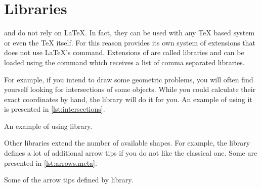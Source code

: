 \section{Libraries}

 and \TikZ{} do not rely on \LaTeX{}. In fact, they can be used with
any \TeX{} based system or even the \TeX{} itself. For this reason \TikZ{}
provides its own system of extensions that does not use \LaTeX{}'s
 command. Extensions of \TikZ{} are called libraries and can be
loaded using the  command which receives a list of comma
separated libraries.

For example, if you intend to draw some geometric problems, you will often find
yourself looking for intersections of some objects. While you could calculate
their exact coordinates by hand, the  library will do it
for you. An example of using it is presented in \autoref{lst:intersections}.

\begin{listing}
  \begin{example}[vertical_mode, examplewidth=0.8\linewidth]
\usetikzlibrary{intersections}

\end{example}
  \caption{An example of using 
    library.}\label{lst:intersections}
\end{listing}

Other libraries extend the number of available shapes. For example, the
 library defines a lot of additional arrow tips if you do
not like the classical one. Some are presented in
\autoref{lst:arrows.meta}.

\begin{listing}
  \begin{example}[vertical_mode, examplewidth=0.8\linewidth]
\usetikzlibrary{arrows.meta}

\end{example}
  \caption{Some of the arrow tips defined by 
    library.}\label{lst:arrows.meta}
\end{listing}


